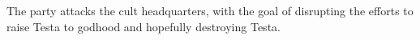 The party attacks the cult headquarters, with the goal of disrupting the efforts to raise Testa to godhood and hopefully destroying Testa.
